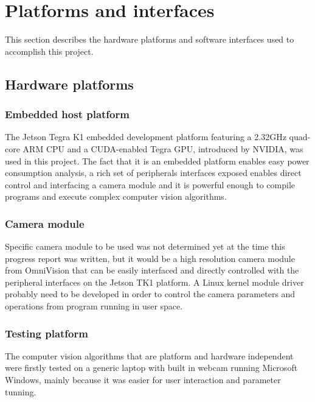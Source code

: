 \chapter{Platforms and interfaces}

This section describes the hardware platforms and software interfaces used to accomplish this project.

\section{Hardware platforms}

\subsection{Embedded host platform}

The Jetson Tegra K1 embedded development platform \cite{NVIDIA:tk1} featuring a 2.32GHz quad-core ARM CPU and a CUDA-enabled Tegra GPU, introduced by NVIDIA, was used in this project. The fact that it is an embedded platform enables easy power consumption analysis, a rich set of peripherals interfaces exposed enables direct control and interfacing a camera module and it is powerful enough to compile programs and execute complex computer vision algorithms.

\subsection{Camera module}
\label{hwsw:camera}

Specific camera module to be used was not determined yet at the time this progress report was written, but it would be a high resolution camera module from OmniVision \cite{ovt} that can be easily interfaced and directly controlled with the peripheral interfaces on the Jetson TK1 platform. A Linux kernel module driver probably need to be developed in order to control the camera parameters and operations from program running in user space.

\subsection{Testing platform}

The computer vision algorithms that are platform and hardware independent were firstly tested on a generic laptop with built in webcam running Microsoft Windows, mainly because it was easier for user interaction and parameter tunning.

